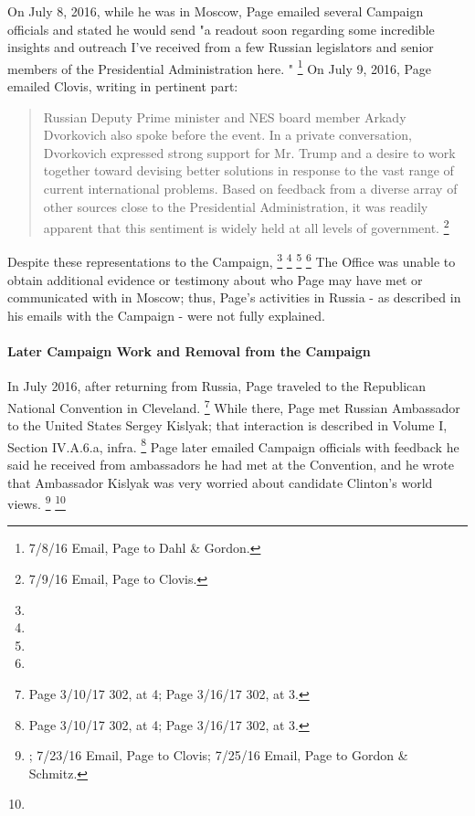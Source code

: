 On July 8, 2016, while he was in Moscow, Page emailed several Campaign officials and stated he would send "a readout soon regarding some incredible insights and outreach I've received from a few Russian legislators and senior members of the Presidential Administration here. "%
\footnote{ 7/8/16 Email, Page to Dahl \& Gordon.}
On July 9, 2016, Page emailed Clovis, writing in pertinent part:

\begin{quote}
Russian Deputy Prime minister and NES board member Arkady Dvorkovich also spoke before the event.
In a private conversation, Dvorkovich expressed strong support for Mr. Trump and a desire to work together toward devising better solutions in response to the vast range of current international problems.
Based on feedback from a diverse array of other sources close to the Presidential Administration, it was readily apparent that this sentiment is widely held at all levels of government.%
\footnote{ 7/9/16 Email, Page to Clovis.}
\end{quote}

Despite these representations to the Campaign,
\footnote{}
\footnote{}
\footnote{}
\footnote{}
The Office was unable to obtain additional evidence or testimony about who Page may have met or communicated with in Moscow; thus, Page's activities in Russia - as described in his emails with the Campaign - were not fully explained.

\paragraph{Later Campaign Work and Removal from the Campaign}

In July 2016, after returning from Russia, Page traveled to the Republican National Convention in Cleveland.%
\footnote{Page 3/10/17 302, at 4;
Page 3/16/17 302, at 3.}
While there, Page met Russian Ambassador to the United States Sergey Kislyak; that interaction is described in Volume I, Section IV.A.6.a, infra.%
\footnote{Page 3/10/17 302, at 4;
Page 3/16/17 302, at 3.}
Page later emailed Campaign officials with feedback he said he received from ambassadors he had met at the Convention, and he wrote that Ambassador Kislyak was very worried about candidate Clinton's world views.%
\footnote{; 7/23/16 Email, Page to Clovis;
7/25/16 Email, Page to Gordon \& Schmitz.}
\footnote{}

